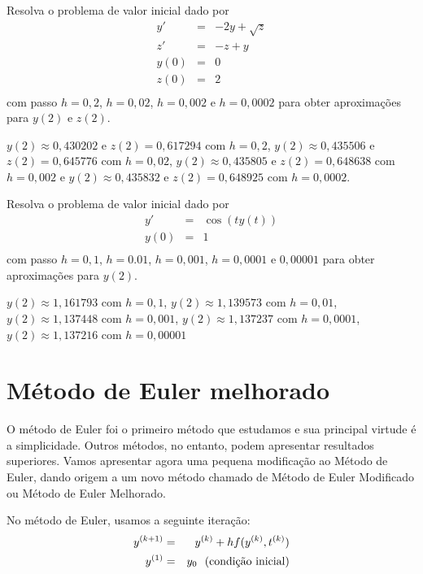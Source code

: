 \begin{exer}Resolva o problema de valor inicial dado por
\begin{eqnarray*}
y'&=& -2y + \sqrt{z}\\
z'&=& -z + y\\
y(0)&=&0\\
z(0)&=&2\\
\end{eqnarray*}
com passo $h=0,2$, $h=0,02$, $h=0,002$ e $h=0,0002$ para obter aproximações para $y(2)$ e $z(2)$.
\end{exer}
\begin{resp}
  
$y(2)\approx 0,430202$ e $z(2)=0,617294$ com $h=0,2$, 
$y(2)\approx 0,435506$ e $z(2)=0,645776$ com $h=0,02$,
$y(2)\approx 0,435805$ e $z(2)=0,648638$ com $h=0,002$ e 
$y(2)\approx 0,435832$ e $z(2)=0,648925$ com $h=0,0002$.     
  
\end{resp}

\begin{exer}Resolva o problema de valor inicial dado por
\begin{eqnarray*}
y'&=& \cos(ty(t))\\
y(0)&=&1\\
\end{eqnarray*}
com passo $h=0,1$, $h=0.01$, $h=0,001$, $h=0,0001$ e $0,00001$ para obter aproximações para $y(2)$. 
\end{exer}
\begin{resp}
  
$y(2)\approx 1,161793$ com $h=0,1$, 
$y(2)\approx 1,139573$ com $h=0,01$,
$y(2)\approx 1,137448$ com $h=0,001$,
$y(2)\approx 1,137237$ com $h=0,0001$,
$y(2)\approx 1,137216$ com $h=0,00001$
  
\end{resp}


\section{Método de Euler melhorado}
O método de Euler foi o primeiro método que estudamos e sua principal virtude é a simplicidade. Outros métodos, no entanto, podem apresentar resultados superiores. Vamos apresentar agora uma pequena modificação ao Método de Euler, dando origem a um novo método chamado de Método de Euler Modificado ou Método de Euler Melhorado.

No método de Euler, usamos a seguinte iteração:
\begin{eqnarray*}
y^{(k+1)}&=&y^{(k)}+hf(y^{(k)},t^{(k)})\\
y^{(1)}&=&y_0~~ \hbox{(condição inicial)}
\end{eqnarray*}

